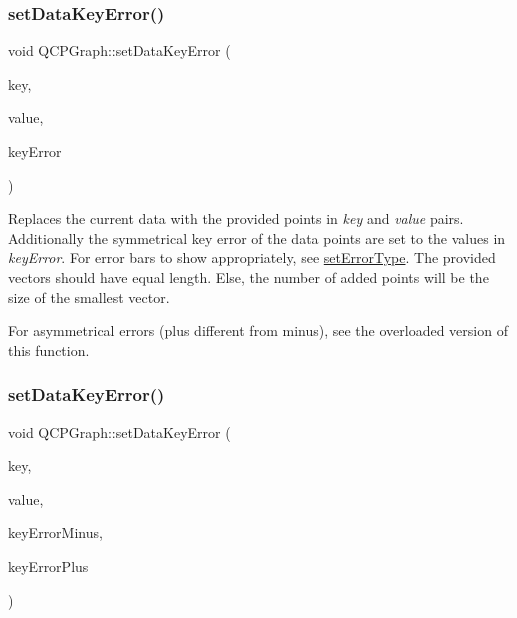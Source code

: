 \subsubsection{\texorpdfstring{set\+Data\+Key\+Error()}{setDataKeyError()}\hspace{0.1cm}{\footnotesize\ttfamily [1/2]}}
{\footnotesize\ttfamily void Q\+C\+P\+Graph\+::set\+Data\+Key\+Error (\begin{DoxyParamCaption}\item[{const Q\+Vector$<$ double $>$ \&}]{key,  }\item[{const Q\+Vector$<$ double $>$ \&}]{value,  }\item[{const Q\+Vector$<$ double $>$ \&}]{key\+Error }\end{DoxyParamCaption})}

Replaces the current data with the provided points in {\itshape key} and {\itshape value} pairs. Additionally the symmetrical key error of the data points are set to the values in {\itshape key\+Error}. For error bars to show appropriately, see \hyperlink{class_q_c_p_graph_ac3614d799c3894f2bc646e99c7f73d38}{set\+Error\+Type}. The provided vectors should have equal length. Else, the number of added points will be the size of the smallest vector.

For asymmetrical errors (plus different from minus), see the overloaded version of this function. \hypertarget{class_q_c_p_graph_ac15c749c5fedf740d5692c6fe67143b8}{}\label{class_q_c_p_graph_ac15c749c5fedf740d5692c6fe67143b8} 
\subsubsection{\texorpdfstring{set\+Data\+Key\+Error()}{setDataKeyError()}\hspace{0.1cm}{\footnotesize\ttfamily [2/2]}}
{\footnotesize\ttfamily void Q\+C\+P\+Graph\+::set\+Data\+Key\+Error (\begin{DoxyParamCaption}\item[{const Q\+Vector$<$ double $>$ \&}]{key,  }\item[{const Q\+Vector$<$ double $>$ \&}]{value,  }\item[{const Q\+Vector$<$ double $>$ \&}]{key\+Error\+Minus,  }\item[{const Q\+Vector$<$ double $>$ \&}]{key\+Error\+Plus }\end{DoxyParamCaption})}

